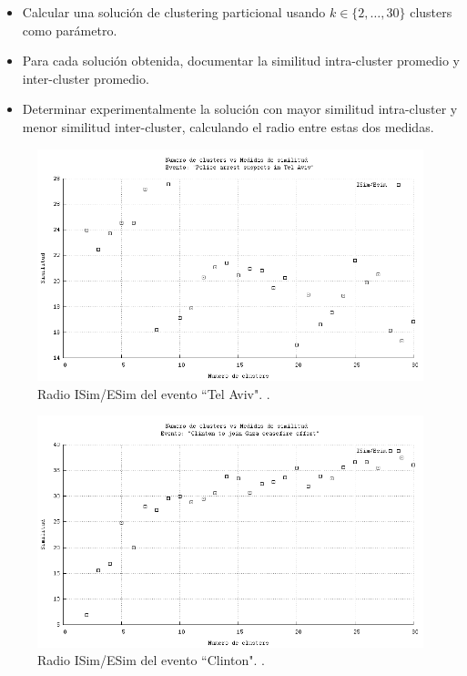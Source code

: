 \documentclass[upright, contnum]{umemoria}
\begin{document}
\begin{itemize}
\item Calcular una solución de clustering particional usando 
  $k \in \{2,\ldots,30\}$ clusters como parámetro.
\item Para cada solución obtenida, documentar la similitud intra-cluster
  promedio y inter-cluster promedio.
\item Determinar experimentalmente la solución con mayor similitud
  intra-cluster y menor similitud inter-cluster, calculando el radio
  entre estas dos medidas.
\end{itemize}
\begin{figure}[h]
  \centering
  \includegraphics[width=14cm]{./img/telaviv-clusters-radio.png}
  \caption[Radios de similitud para evento 1]
   { Radio ISim/ESim del evento ``Tel Aviv". \label{fig:telaviv-radio}. }
\end{figure}

\begin{figure}[h]
  \centering
  \includegraphics[width=14cm]{./img/clinton-clusters-radio.png}
  \caption[Radios de similitud para evento 2]
   { Radio ISim/ESim del evento ``Clinton". \label{fig:clinton-radio}. }
\end{figure}
\end{document}
